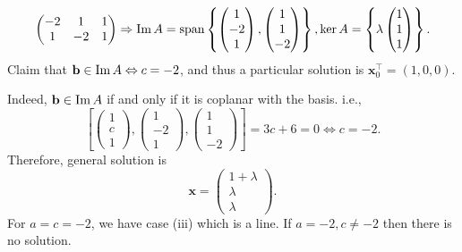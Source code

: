 \documentclass[a4paper]{article}
\begin{document}
\begin{example}
\begin{itemize}
\[\begin{pmatrix}
              -2&1&1\\
              1&-2&1
            \end{pmatrix} \Rightarrow \operatorname{Im} A=\operatorname{span}\left\{
              \begin{pmatrix}
                1\\-2\\1
              \end{pmatrix},
              \begin{pmatrix}
                1\\1\\-2
            \end{pmatrix} \right\}, \ker A = \left\{ \lambda
              \begin{pmatrix}
                1\\1\\1
            \end{pmatrix} \right\}
          .\]
          Claim that $ \mathbf{b}\in \operatorname{Im} A \Leftrightarrow c=-2$, and
          thus a particular solution is $ \mathbf{x}_0^{\top}=(1,0,0) $.

          Indeed, $\mathbf{b}\in \operatorname{Im} A$ if and only if it is coplanar
          with the basis. i.e.,
          \[
            \left[
              \begin{pmatrix}
                1\\c\\1
              \end{pmatrix},
              \begin{pmatrix}
                1\\-2\\1
              \end{pmatrix},
              \begin{pmatrix}
                1\\1\\-2
            \end{pmatrix} \right]=3c+6=0 \Leftrightarrow c=-2
          .\]
          Therefore, general solution is
          \[
            \mathbf{x}=
            \begin{pmatrix}
              1+\lambda\\\lambda\\\lambda
            \end{pmatrix}
          .\]
          For $a=c=-2$, we have case (iii) which is a line. If $
          a=-2,c\neq -2 $ then there is no solution.
      \end{itemize}
    \end{example}
\end{document}
